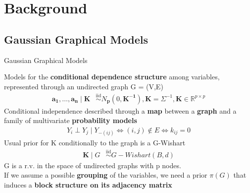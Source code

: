 

\section{Background}
\newcommand{\iid}{\overset{\mathrm{iid}}{\sim}}
\newcommand{\ind}{\overset{\mathrm{ind}}{\sim}}

\subsection{Gaussian Graphical Models}
\begin{frame}{Gaussian Graphical Models}

    Models for the \textbf{conditional dependence structure} among variables, represented through an undirected graph G = (V,E)
    \begin{align*}
    \mathbf{a_{1}}, \ldots, \mathbf{a_{n}} \mid \mathbf{K} &\iid N_\mathbf{{p}}(0,\mathbf{K^{-1}}), \mathbf{K}=\Sigma^{-1}, \mathbf{K} \in \mathbb{R}^{p\times p}  %
    \end{align*}
Conditional independence described through a \textbf{map} between a \textbf{graph} and a family of multivariate \textbf{probability models}
\begin{align*}
Y_{i}\perp Y_{j} \mid Y_{-(ij)}\Leftrightarrow (i,j) \notin E \Leftrightarrow k_{ij}=0
\end{align*}
Usual prior for K conditionally to the graph is a G-Wishart
\centering
\begin{align*}
    \mathbf{K} \mid G &\iid G-Wishart(B,d)
\end{align*}
G is a r.v. in the space of undirected graphs with p nodes.\\
If we assume a possible \textbf{grouping} of the variables, we need a prior $\pi(G)$ that induces a \textbf{block structure on its adjacency matrix}

\end{frame}



 


